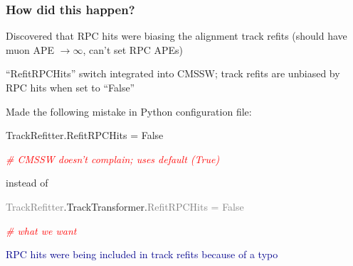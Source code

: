 \documentclass[compress]{beamer}
\begin{document}
\begin{frame}
\frametitle{How did this happen?}
\begin{description}\setlength{\itemsep}{0.3 cm}
\item[Feb 2007:] Discovered that RPC hits were biasing the alignment track refits (should have muon APE $\to \infty$, can't set RPC APEs)

\item[Aug 2007:] ``RefitRPCHits'' switch integrated into CMSSW; track
  refits are unbiased by RPC hits when set to ``False''

\item[$\begin{array}{c} \mbox{sometime} \\ \mbox{before} \\ \mbox{CRAFT-08:} \end{array}$] Made the following mistake in Python configuration file:

TrackRefitter.RefitRPCHits = False

\hfill \textcolor{red}{\it \# CMSSW doesn't complain; uses default (True)}

\vspace{0.25 cm}
instead of

\vspace{0.25 cm}
\textcolor{gray}{TrackRefitter}.TrackTransformer.\textcolor{gray}{RefitRPCHits = False}

\hfill \textcolor{red}{\it \# what we want}
\end{description}

\textcolor{darkblue}{RPC hits were being included in track refits because of a typo}
\end{frame}
\end{document}
